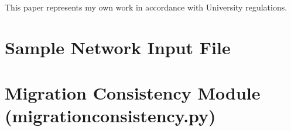 \documentclass[pageno]{jpaper}
\begin{document}
This paper represents my own work in accordance with University regulations.




\appendix
\appendixpage

\section{Sample Network Input File}
\label{apndx:net}



\section{Migration Consistency Module (migration\textunderscore consistency.py)}

\end{document}
